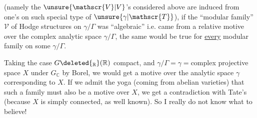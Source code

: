 (namely the $\unsure{\mathscr{V}|V}$'s considered above are induced from one's on such special type of $\unsure{\gamma|\mathscr{T}}$), if the ``modular family'' $\mathscr{V}$ of Hodge structures on  $\gamma/\Gamma$ was ``algebraic'' i.e. came from a relative motive over the complex analytic space $\gamma/\Gamma$,  the same would be true for \uline{every} modular family on some $\gamma/\Gamma$.

Taking the case $G\deleted{_{\mathbb{R}}}(\mathbb{R})$ compact,  and  $\gamma/\Gamma=\gamma={}$complex projective  space $X$ under $G_{\mathbb{C}}$ by Borel, we would get a  motive over the analytic space $\gamma$ corresponding to $X$. If we admit the  yoga (coming from  abelian varieties) that such a family must also be a motive over $X$,  we  get a contradiction with Tate's   (because $X$ is simply connected, as well known). So I really do not know what to believe!
